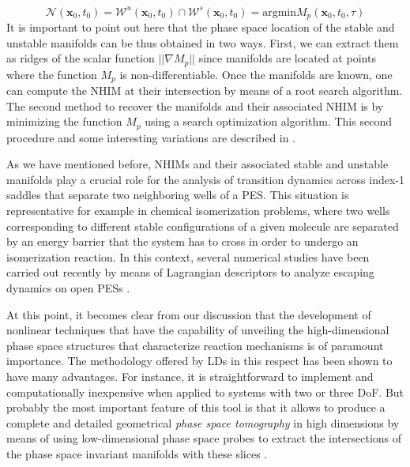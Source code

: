 \documentclass[9pt]{article}
\begin{document}
\begin{equation}
\mathcal{N}(\mathbf{x}_{0},t_0) = \mathcal{W}^u(\mathbf{x}_{0},t_0) \cap \mathcal{W}^s(\mathbf{x}_{0},t_0) = \textrm{argmin} M_p(\mathbf{x}_{0},t_0,\tau)
\label{min_NHIM_LD}
\end{equation}
It is important to point out here that the phase space location of the stable and unstable manifolds can be thus obtained in two ways. First, we can extract them as ridges of the scalar function $||\nabla M_p||$ since manifolds are located at points where the function $M_p$ is non-differentiable. Once the manifolds are known, one can compute the NHIM at their intersection by means of a root search algorithm. The second method to recover the manifolds and their associated NHIM is by minimizing the function $M_p$ using a search optimization algorithm. This second procedure and some interesting variations are described in \cite{feldmaier2019}.

As we have mentioned before, NHIMs and their associated stable and unstable manifolds play a crucial role for the analysis of transition dynamics across index-1 saddles that separate two neighboring wells of a PES. This situation is representative for example in chemical isomerization problems, where two wells corresponding to different stable configurations of a given molecule are separated by an energy barrier that the system has to cross in order to undergo an isomerization reaction. In this context, several numerical studies have been carried out recently by means of Lagrangian descriptors to analyze escaping dynamics on open PESs \cite{demian2017,naik2019b,GG2019}. 

At this point, it becomes clear from our discussion that the development of nonlinear techniques that have the capability of unveiling the high-dimensional phase space structures that characterize reaction mechanisms is of paramount importance. The methodology offered by LDs in this respect has been shown to have many advantages. For instance, it is straightforward to implement and computationally inexpensive when applied to systems with two or three DoF. But probably the most important feature of this tool is that it allows to produce a complete and detailed geometrical \textit{phase space tomography} in high dimensions by means of using low-dimensional phase space probes to extract the intersections of the phase space invariant manifolds with these slices \cite{demian2017,naik2019a,naik2019b,GG2019}. 
\end{document}
